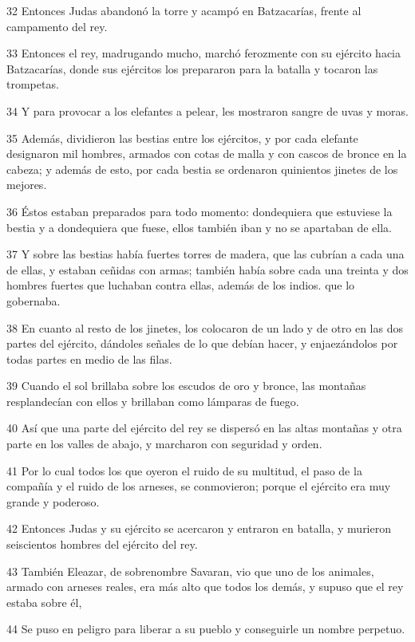 \par 32 Entonces Judas abandonó la torre y acampó en Batzacarías, frente al campamento del rey.
\par 33 Entonces el rey, madrugando mucho, marchó ferozmente con su ejército hacia Batzacarías, donde sus ejércitos los prepararon para la batalla y tocaron las trompetas.
\par 34 Y para provocar a los elefantes a pelear, les mostraron sangre de uvas y moras.
\par 35 Además, dividieron las bestias entre los ejércitos, y por cada elefante designaron mil hombres, armados con cotas de malla y con cascos de bronce en la cabeza; y además de esto, por cada bestia se ordenaron quinientos jinetes de los mejores.
\par 36 Éstos estaban preparados para todo momento: dondequiera que estuviese la bestia y a dondequiera que fuese, ellos también iban y no se apartaban de ella.
\par 37 Y sobre las bestias había fuertes torres de madera, que las cubrían a cada una de ellas, y estaban ceñidas con armas; también había sobre cada una treinta y dos hombres fuertes que luchaban contra ellas, además de los indios. que lo gobernaba.
\par 38 En cuanto al resto de los jinetes, los colocaron de un lado y de otro en las dos partes del ejército, dándoles señales de lo que debían hacer, y enjaezándolos por todas partes en medio de las filas.
\par 39 Cuando el sol brillaba sobre los escudos de oro y bronce, las montañas resplandecían con ellos y brillaban como lámparas de fuego.
\par 40 Así que una parte del ejército del rey se dispersó en las altas montañas y otra parte en los valles de abajo, y marcharon con seguridad y orden.
\par 41 Por lo cual todos los que oyeron el ruido de su multitud, el paso de la compañía y el ruido de los arneses, se conmovieron; porque el ejército era muy grande y poderoso.
\par 42 Entonces Judas y su ejército se acercaron y entraron en batalla, y murieron seiscientos hombres del ejército del rey.
\par 43 También Eleazar, de sobrenombre Savaran, vio que uno de los animales, armado con arneses reales, era más alto que todos los demás, y supuso que el rey estaba sobre él,
\par 44 Se puso en peligro para liberar a su pueblo y conseguirle un nombre perpetuo.
